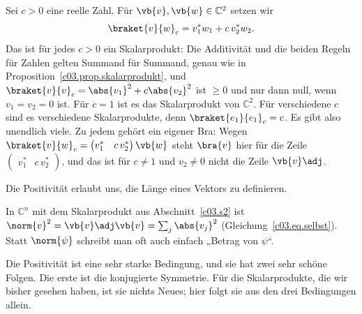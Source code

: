\begin{example}\label{c03.ex.gewichtet}
  Sei $c > 0$ eine reelle Zahl. Für $\vb{v}, \vb{w} \in \mathbb{C}^2$ setzen wir
  \begin{equation}\label{c03.eq.gewichtet}
    \braket{v}{w}_c = v_1^* w_1 + c\, v_2^* w_2 .
  \end{equation}
  Das ist für jedes $c > 0$ ein Skalarprodukt: Die Additivität und die beiden Regeln für Zahlen
  gelten Summand für Summand, genau wie in Proposition~\ref{c03.prop.skalarprodukt}, und
  $\braket{v}{v}_c = \abs{v_1}^2 + c \abs{v_2}^2$ ist $\geq 0$ und nur dann null, wenn
  $v_1 = v_2 = 0$ ist. Für $c = 1$ ist es das Skalarprodukt von $\mathbb{C}^2$. Für verschiedene
  $c$ sind es verschiedene Skalarprodukte, denn $\braket{e_1}{e_1}_c = c$. Es gibt also
  unendlich viele. Zu jedem gehört ein eigener Bra: Wegen
  $\braket{v}{w}_c = \begin{pmatrix} v_1^* & c\, v_2^* \end{pmatrix} \vb{w}$ steht $\bra{v}$
  hier für die Zeile $\begin{pmatrix} v_1^* & c\, v_2^* \end{pmatrix}$, und das ist für
  $c \neq 1$ und $v_2 \neq 0$ nicht die Zeile $\vb{v}\adj$.
\end{example}

Die Positivität erlaubt uns, die Länge eines Vektors zu definieren.


In $\mathbb{C}^n$ mit dem Skalarprodukt aus Abschnitt~\ref{c03.s2} ist
$\norm{v}^2 = \vb{v}\adj\vb{v} = \sum_j \abs{v_j}^2$ (Gleichung~\eqref{c03.eq.selbst}). Statt $\norm{\psi}$ schreibt man oft auch einfach „Betrag
von $\psi$“.

Die Positivität ist eine sehr starke Bedingung, und sie hat zwei sehr schöne Folgen. Die erste
ist die konjugierte Symmetrie. Für die Skalarprodukte, die wir bisher gesehen haben, ist sie
nichts Neues; hier folgt sie aus den drei Bedingungen allein.

